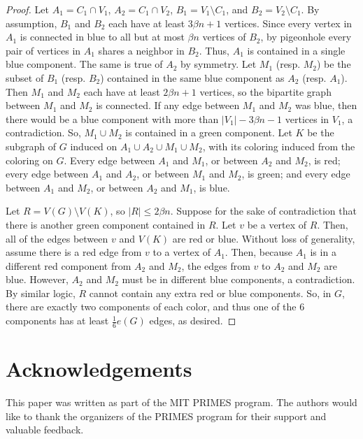 \documentclass[12pt]{amsart}
\theoremstyle{definition}
\numberwithin{equation}{section}
\begin{document}
\begin{proof}
    Let $A_1=C_1\cap V_1$, $A_2=C_1\cap V_2$, $B_1 = V_1\setminus C_1$, and $B_2 = V_2\setminus C_1$.
    By assumption, $B_1$ and $B_2$ each have at least $3\beta n+1$ vertices.
    Since every vertex in $A_1$ is connected in blue to all but at most $\beta n$ vertices of $B_2$, by pigeonhole every pair of vertices in $A_1$ shares a neighbor in $B_2$.
    Thus, $A_1$ is contained in a single blue component. The same is true of $A_2$ by symmetry.
    Let $M_1$ (resp. $M_2$) be the subset of $B_1$ (resp. $B_2$) contained in the same blue component as $A_2$ (resp. $A_1$). Then $M_1$ and $M_2$ each have at least $2\beta n+1$ vertices, so the bipartite graph between $M_1$ and $M_2$ is connected.
    If any edge between $M_1$ and $M_2$ was blue, then there would be a blue component with more than $|V_1|-3\beta n-1$ vertices in $V_1$,
    a contradiction.
    So, $M_1\cup M_2$ is contained in a green component. Let $K$ be the subgraph of $G$ induced on $A_1 \cup A_2 \cup M_1 \cup M_2$, with its coloring induced from the coloring on $G$. Every edge between $A_1$ and $M_1$, or between $A_2$ and $M_2$, is red;
    every edge between $A_1$ and $A_2$, or between $M_1$ and $M_2$, is green; and every edge between $A_1$ and $M_2$, or between $A_2$ and $M_1$, is blue.

    Let $R=V(G)\setminus V(K)$, so $|R|\le 2\beta n$.
    Suppose for the sake of contradiction that there is another green component contained in $R$.
    Let $v$ be a vertex of $R$. Then, all of the edges between $v$ and $V(K)$ are red or blue.
    Without loss of generality, assume there is a red edge from $v$ to a vertex of $A_1$.
    Then, because $A_1$ is in a different red component from $A_2$ and $M_2$, the edges from $v$ to $A_2$ and $M_2$ are blue.
    However, $A_2$ and $M_2$ must be in different blue components, a contradiction.
    By similar logic, $R$ cannot contain any extra red or blue components.
    So, in $G$, there are exactly two components of each color, 
    and thus one of the $6$ components has at least $\frac16e(G)$ edges, as desired.
\end{proof}



\section{Acknowledgements}

This paper was written as part of the MIT PRIMES program. The authors would like to thank the organizers of the PRIMES program for their support and valuable feedback.
\end{document}
